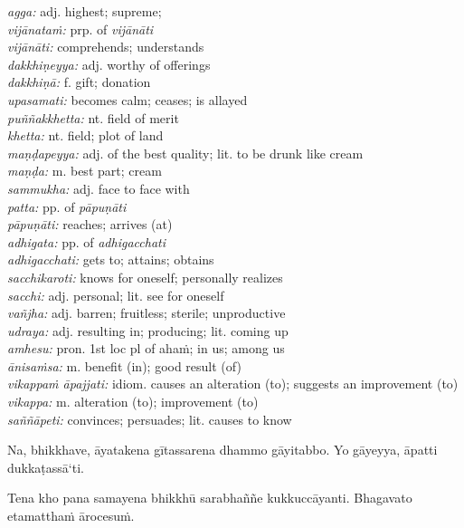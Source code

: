 \documentclass[11pt,oneside]{memoir}
\begin{document}
\begin{widecols}
\emph{agga:} adj. highest; supreme;\\[0pt]
\emph{vijānataṁ:} prp. of \emph{vijānāti}\\[0pt]
\emph{vijānāti:} comprehends; understands\\[0pt]
\emph{dakkhiṇeyya:} adj. worthy of offerings\\[0pt]
\emph{dakkhiṇā:} f. gift; donation\\[0pt]
\emph{upasamati:} becomes calm; ceases; is allayed\\[0pt]
\emph{puññakkhetta:} nt. field of merit\\[0pt]
\emph{khetta:} nt. field; plot of land\\[0pt]
\emph{maṇḍapeyya:} adj. of the best quality; lit. to be drunk like cream\\[0pt]
\emph{maṇḍa:} m. best part; cream\\[0pt]
\emph{sammukha:} adj. face to face with\\[0pt]
\emph{patta:} pp. of \emph{pāpuṇāti}\\[0pt]
\emph{pāpuṇāti:} reaches; arrives (at)\\[0pt]
\emph{adhigata:} pp. of \emph{adhigacchati}\\[0pt]
\emph{adhigacchati:} gets to; attains; obtains\\[0pt]
\emph{sacchikaroti:} knows for oneself; personally realizes\\[0pt]
\emph{sacchi:} adj. personal; lit. see for oneself\\[0pt]
\emph{vañjha:} adj. barren; fruitless; sterile; unproductive\\[0pt]
\emph{udraya:} adj. resulting in; producing; lit. coming up\\[0pt]
\emph{amhesu:} pron. 1st loc pl of ahaṁ; in us; among us\\[0pt]
\emph{ānisaṁsa:} m. benefit (in); good result (of)\\[0pt]
\emph{vikappaṁ āpajjati:} idiom. causes an alteration (to); suggests an improvement (to)\\[0pt]
\emph{vikappa:} m. alteration (to); improvement (to)\\[0pt]
\emph{saññāpeti:} convinces; persuades; lit. causes to know
\end{widecols}

\clearpage

Na, bhikkhave, āyatakena gītassarena dhammo gāyitabbo. Yo gāyeyya, āpatti dukkaṭassā`ti.

Tena kho pana samayena bhikkhū sarabhaññe kukkuccāyanti. Bhagavato etamatthaṁ ārocesuṁ.
\end{document}
